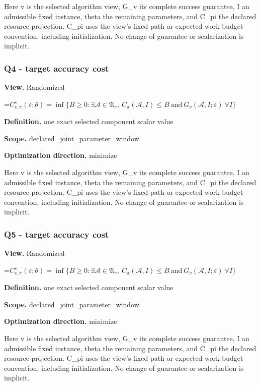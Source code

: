 \documentclass[10pt,a4paper]{article}
\newcommand{\AtlasMath}[1]{\par\begingroup\centering\setbox0=\hbox{$\displaystyle #1$}\ifdim\wd0>1.4\linewidth\typeout{ATLAS WIDE FORMULA: \the\wd0}\fi\ifdim\wd0>\linewidth\resizebox{\linewidth}{!}{\box0}\else\box0\fi\par\endgroup}
\begin{document}
Here v is the selected algorithm view, G\_v its complete success guarantee, I an admissible fixed instance, theta the remaining parameters, and C\_pi the declared resource projection. C\_pi uses the view's fixed-path or expected-work budget convention, including initialization. No change of guarantee or scalarization is implicit.

\subsubsection{Q4 - target accuracy cost}
\textbf{View.} Randomized

\AtlasMath{C^\star_{v,\pi}(\varepsilon;\theta)=\inf\{B\ge0:\exists\mathcal A\in\mathfrak A_v,\ C_\pi(\mathcal A,I)\le B\ \text{and}\ G_v(\mathcal A,I;\varepsilon)\ \forall I\}}
\textbf{Definition.} one exact selected component scalar value

\textbf{Scope.} declared\_joint\_parameter\_window

\textbf{Optimization direction.} minimize

Here v is the selected algorithm view, G\_v its complete success guarantee, I an admissible fixed instance, theta the remaining parameters, and C\_pi the declared resource projection. C\_pi uses the view's fixed-path or expected-work budget convention, including initialization. No change of guarantee or scalarization is implicit.

\subsubsection{Q5 - target accuracy cost}
\textbf{View.} Randomized

\AtlasMath{C^\star_{v,\pi}(\varepsilon;\theta)=\inf\{B\ge0:\exists\mathcal A\in\mathfrak A_v,\ C_\pi(\mathcal A,I)\le B\ \text{and}\ G_v(\mathcal A,I;\varepsilon)\ \forall I\}}
\textbf{Definition.} one exact selected component scalar value

\textbf{Scope.} declared\_joint\_parameter\_window

\textbf{Optimization direction.} minimize

Here v is the selected algorithm view, G\_v its complete success guarantee, I an admissible fixed instance, theta the remaining parameters, and C\_pi the declared resource projection. C\_pi uses the view's fixed-path or expected-work budget convention, including initialization. No change of guarantee or scalarization is implicit.
\end{document}
